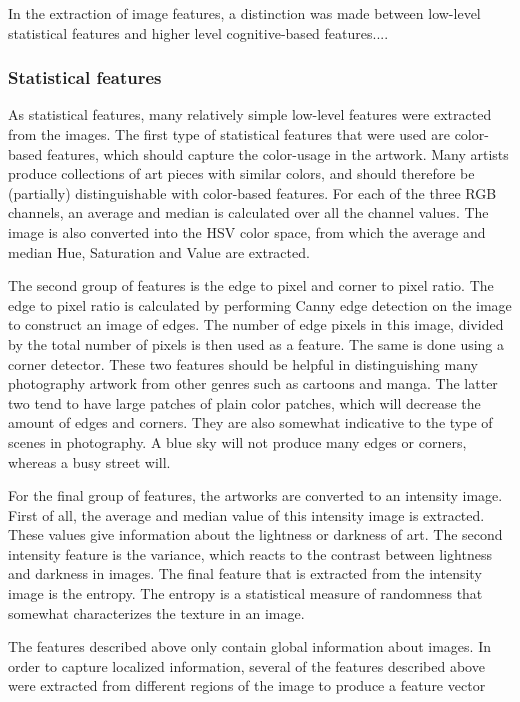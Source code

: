 In the extraction of image features, a distinction was made between low-level statistical features and higher level cognitive-based features....

\subsubsection{Statistical features}
As statistical features, many relatively simple low-level features were extracted from the images.
The first type of statistical features that were used are color-based features, which should capture the color-usage in the artwork. Many artists produce collections of art pieces with similar colors, and should therefore be (partially) distinguishable with color-based features. For each of the three RGB channels, an average and median is calculated over all the channel values. The image is also converted into the HSV color space, from which the average and median Hue, Saturation and Value are extracted.  

The second group of features is the edge to pixel and corner to pixel ratio. The edge to pixel ratio is calculated by performing Canny edge detection on the image to construct an image of edges. The number of edge pixels in this image, divided by the total number of pixels is then used as a feature. The same is done using a corner detector. These two features should be helpful in distinguishing many photography artwork from other genres such as cartoons and manga. The latter two tend to have large patches of plain color patches, which will decrease the amount of edges and corners. They are also somewhat indicative to the type of scenes in photography. A blue sky will not produce many edges or corners, whereas a busy street will.  

For the final group of features, the artworks are converted to an intensity image. First of all, the average and median value of this intensity image is extracted. These values give information about the lightness or darkness of art. The second intensity feature is the variance, which reacts to the contrast between lightness and darkness in images. The final feature that is extracted from the intensity image is the entropy. The entropy is a statistical measure of randomness that somewhat characterizes the texture in an image.  

The features described above only contain global information about images. In order to capture localized information, several of the features described above were extracted from different regions of the image to produce a feature vector



